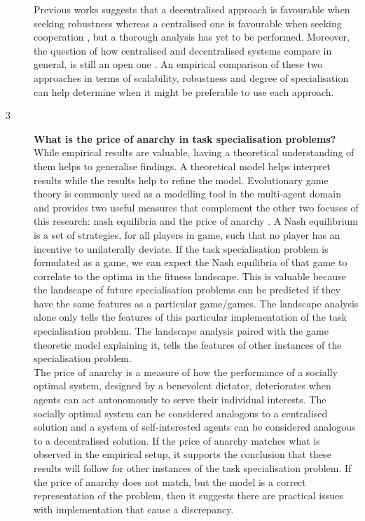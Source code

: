 \documentclass[12pt]{article}
\begin{document}
\begin{description}
Previous works suggests that a decentralised approach is favourable when seeking robustness whereas a centralised one is favourable when seeking cooperation \cite{wiegand:GECCO:2006}, but a thorough analysis has yet to be performed. 
Moreover, the question of how centralised and decentralised systems compare in general, is still an open one \cite{vanLon:AAMAS:2017}.
An empirical comparison of these two approaches in terms of scalability, robustness and degree of specialisation can help determine when it might be preferable to use each approach.

\item[3] \textbf{What is the price of anarchy in task specialisation problems?}\\

While empirical results are valuable, having a theoretical understanding of them helps to generalise findings.
A theoretical model helps interpret results while the results help to refine the model.
Evolutionary game theory is commonly used as a modelling tool in the multi-agent domain \cite{panait:AAMAS:2005, wiegand:GECCO:2006, lanctot:NeurIPS:2017} and provides two useful measures that complement the other two focuses of this research: nash equilibria \cite{hofbauer:BAMS:2003} and the price of anarchy \cite{koutsoupias:ASTACS:1999}.
A Nash equilibrium is a set of strategies, for all players in game, such that no player has an incentive to unilaterally deviate.
If the task specialisation problem is formulated as a game, we can expect the Nash equilibria of that game to correlate to the optima in the fitness landscape.
This is valuable because the landscape of future specialisation problems can be predicted if they have the same features as a particular game/games.
The landscape analysis alone only tells the features of this particular implementation of the task specialisation problem.
The landscape analysis paired with the game theoretic model explaining it, tells the features of other instances of the specialisation problem.\\

The price of anarchy is a measure of how the performance of a socially optimal system, designed by a benevolent dictator, deteriorates when agents can act autonomously to serve their individual interests.
The socially optimal system can be considered analogous to a centralised solution and a system of self-interested agents can be considered analogous to a decentralised solution.
If the price of anarchy matches what is observed in the empirical setup, it supports the conclusion that these results will follow for other instances of the task specialisation problem.
If the price of anarchy does not match, but the model is a correct representation of the problem, then it suggests there are practical issues with implementation that cause a discrepancy.

\end{description}
\end{document}
